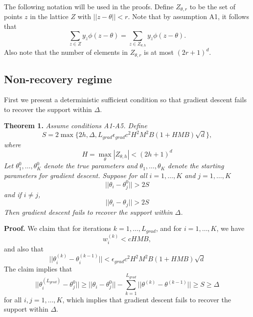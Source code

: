 \documentclass[11pt]{article}
\begin{document}
The following notation will be used in the proofs.
Define $Z_{\theta, r}$ to be the set of points $z$ in the lattice $Z$ with $||z - \theta|| < r$.
Note that by assumption A1, it follows that
\[
\sum_{z \in Z} y_z \phi(z - \theta) = \sum_{z \in Z_{\theta, h}} y_z \phi(z - \theta).
\]
Also note that the number of elements in $Z_{\theta, r}$ is at most $(2r + 1)^d$.

\subsection{Non-recovery regime}

First we present a deterministic sufficient condition so that gradient descent fails to recover the support within $\Delta$.

\textbf{Theorem 1.}
\emph{
Assume conditions A1-A5.
Define
\[S = 2\max\{2h, \Delta, L_{grad}\epsilon_{grad} c^2 H^2M^2B (1 + H MB)\sqrt{d} \},\]
where
\[
H = \max_\theta |Z_{\theta, h}| < (2h+1)^d
\]
Let $\theta_1^0,\hdots, \theta_K^0$ denote the true parameters
and $\theta_1,\hdots, \theta_K$ denote the starting parameters for gradient descent.
Suppose for all $i=1,\hdots, K$ and $j = 1,\hdots, K$ 
\[
||\theta_i - \theta_j^0|| > 2S
\]
and if $i \neq j$,
\[
||\theta_i - \theta_j|| > 2S
\]
Then gradient descent fails to recover the support within $\Delta$.
}

\textbf{Proof.}
We claim that for iterations $k = 1,\hdots, L_{grad}$, and for $i = 1,\hdots, K$, we have
\[
w_i^{(k)} < c HMB,
\]
and also that
\[
||\theta^{(k)}_i - \theta^{(k-1)}_i|| < \epsilon_{grad} c^2 H^2M^2B (1 + H MB)\sqrt{d}
\]
The claim implies that
\[
||\theta_i^{(L_{grad})} - \theta_j^0|| \geq ||\theta_i - \theta_j^0|| - \sum_{k=1}^{L_{grad}} ||\theta^{(k)} - \theta^{(k-1)}|| \geq S \geq \Delta
\]
for all $i, j = 1,\hdots, K$,
which implies that gradient descent fails to recover the support within $\Delta$.
\end{document}
